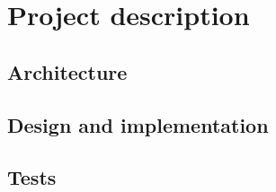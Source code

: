 \chapter{Project description}

\section{Architecture}

\section{Design and implementation}

\section{Tests}
